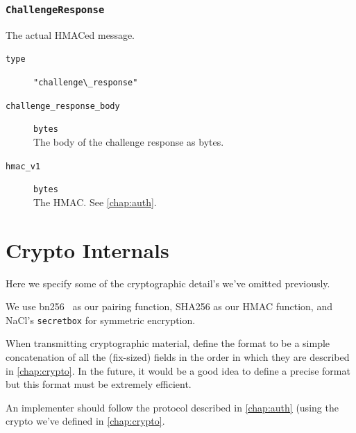 \documentclass[pdftex,12pt,a4papaer,twoside,notitlepage]{report}
\begin{document}
\begin{appendices}
\subsubsection{\texttt{ChallengeResponse}}
\label{struct:challenge_response}

The actual HMACed message.

\begin{leftbar}
\begin{description}
\item[\texttt{type}] \verb="challenge\_response"=
\item[\texttt{challenge\_response\_body}] \texttt{bytes} \\ 
  The body of the challenge response as bytes.
\item[\texttt{hmac\_v1}] \texttt{bytes} \\ 
  The HMAC. See \cref{chap:auth}.
\end{description}
\end{leftbar}

\section{Crypto Internals}
\label{sec:crypto-spec}

Here we specify some of the cryptographic detail's we've omitted previously.

We use bn256~\cite{bn256} as our pairing function, SHA256 as our HMAC function,
and NaCl's\cite{nacl} \texttt{secretbox} for symmetric encryption.

When transmitting cryptographic material, define the format to be a simple
concatenation of all the (fix-sized) fields in the order in which they are
described in \cref{chap:crypto}. In the future, it would be a good idea to
define a precise format but this format must be extremely efficient.

An implementer should follow the protocol described in \cref{chap:auth} (using
the crypto we've defined in \cref{chap:crypto}.

\end{appendices}
\end{document}
